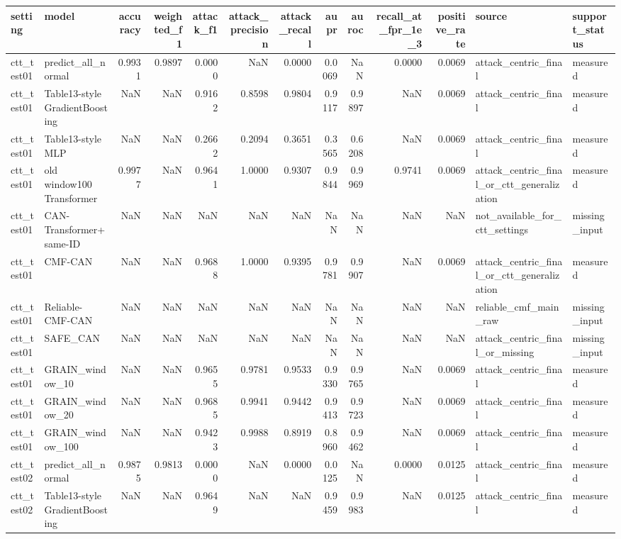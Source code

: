 \begin{tabular}{llrrrrrrrrrll}
\toprule
setting & model & accuracy & weighted_f1 & attack_f1 & attack_precision & attack_recall & aupr & auroc & recall_at_fpr_1e_3 & positive_rate & source & support_status \\
\midrule
ctt_test01 & predict_all_normal & 0.9931 & 0.9897 & 0.0000 & NaN & 0.0000 & 0.0069 & NaN & 0.0000 & 0.0069 & attack_centric_final & measured \\
ctt_test01 & Table13-style GradientBoosting & NaN & NaN & 0.9162 & 0.8598 & 0.9804 & 0.9117 & 0.9897 & NaN & 0.0069 & attack_centric_final & measured \\
ctt_test01 & Table13-style MLP & NaN & NaN & 0.2662 & 0.2094 & 0.3651 & 0.3565 & 0.6208 & NaN & 0.0069 & attack_centric_final & measured \\
ctt_test01 & old window100 Transformer & 0.9977 & NaN & 0.9641 & 1.0000 & 0.9307 & 0.9844 & 0.9969 & 0.9741 & 0.0069 & attack_centric_final_or_ctt_generalization & measured \\
ctt_test01 & CAN-Transformer+ same-ID & NaN & NaN & NaN & NaN & NaN & NaN & NaN & NaN & NaN & not_available_for_ctt_settings & missing_input \\
ctt_test01 & CMF-CAN & NaN & NaN & 0.9688 & 1.0000 & 0.9395 & 0.9781 & 0.9907 & NaN & 0.0069 & attack_centric_final_or_ctt_generalization & measured \\
ctt_test01 & Reliable-CMF-CAN & NaN & NaN & NaN & NaN & NaN & NaN & NaN & NaN & NaN & reliable_cmf_main_raw & missing_input \\
ctt_test01 & SAFE_CAN & NaN & NaN & NaN & NaN & NaN & NaN & NaN & NaN & NaN & attack_centric_final_or_missing & missing_input \\
ctt_test01 & GRAIN_window_10 & NaN & NaN & 0.9655 & 0.9781 & 0.9533 & 0.9330 & 0.9765 & NaN & 0.0069 & attack_centric_final & measured \\
ctt_test01 & GRAIN_window_20 & NaN & NaN & 0.9685 & 0.9941 & 0.9442 & 0.9413 & 0.9723 & NaN & 0.0069 & attack_centric_final & measured \\
ctt_test01 & GRAIN_window_100 & NaN & NaN & 0.9423 & 0.9988 & 0.8919 & 0.8960 & 0.9462 & NaN & 0.0069 & attack_centric_final & measured \\
ctt_test02 & predict_all_normal & 0.9875 & 0.9813 & 0.0000 & NaN & 0.0000 & 0.0125 & NaN & 0.0000 & 0.0125 & attack_centric_final & measured \\
ctt_test02 & Table13-style GradientBoosting & NaN & NaN & 0.9649 & NaN & NaN & 0.9459 & 0.9983 & NaN & 0.0125 & attack_centric_final & measured \\

\end{tabular}
